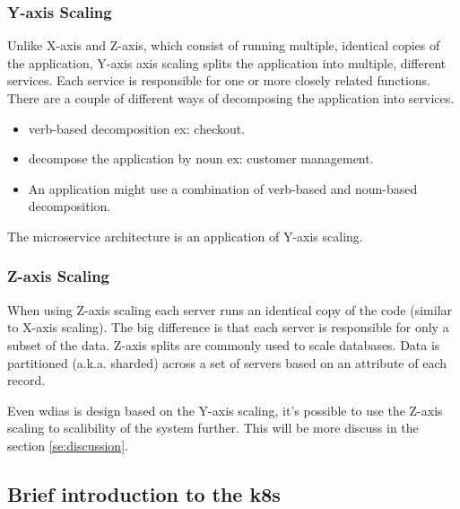 \subsubsection{Y-axis Scaling}
Unlike X-axis and Z-axis, which consist of running multiple, identical copies of the application, Y-axis axis scaling splits the application into multiple, different services. Each service is responsible for one or more closely related functions. There are a couple of different ways of decomposing the application into services.
\begin{itemize}
    \item verb-based decomposition ex: checkout.
    \item decompose the application by noun ex: customer management. 
    \item An application might use a combination of verb-based and noun-based decomposition.
\end{itemize}
    
The microservice architecture is an application of Y-axis scaling.

\subsubsection{Z-axis Scaling}
When using Z-axis scaling each server runs an identical copy of the code (similar to X-axis scaling). The big difference is that each server is responsible for only a subset of the data. 
Z-axis splits are commonly used to scale databases. Data is partitioned (a.k.a. sharded) across a set of servers based on an attribute of each record.

Even \acrshort{wdias} is design based on the Y-axis scaling, it's possible to use the Z-axis scaling to scalibility of the system further. This will be more discuss in the section \ref{se:discussion}.

\subsection{Brief introduction to the \acrfull{k8s}}
\label{sebse:k8s_intro}

